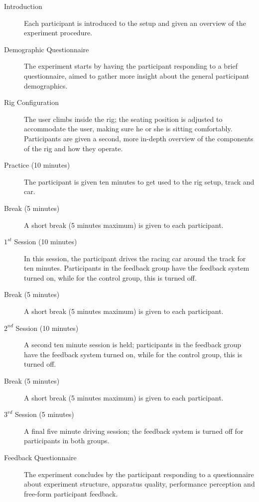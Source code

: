\documentclass{sig-alternate}
\begin{document}
\begin{description}
	\item[Introduction] Each participant is introduced to the setup and given an overview of the experiment procedure. 
	
	\item[Demographic Questionnaire] The experiment starts by having the participant responding to a brief questionnaire, aimed to gather more insight about the general participant demographics.
	
	\item[Rig Configuration] 
	The user climbs inside the rig; the seating position is adjusted to accommodate the user, making sure he or she is sitting comfortably. Participants are given a second, more in-depth overview of the components of the rig and how they operate.
	
	\item[Practice (10 minutes)] The participant is given ten minutes to get used to the rig setup, track and car.
	
	\item[Break (5 minutes)] A short break (5 minutes maximum) is given to each participant.
	
	\item[$1^{st}$ Session (10 minutes)] In this session, the participant drives the racing car around the track for ten minutes. Participants in the feedback group have the feedback system turned on, while for the control group, this is turned off.
	
	\item[Break (5 minutes)] A short break (5 minutes maximum) is given to each participant.
	
	\item[$2^{nd}$ Session (10 minutes)] A second ten minute session is held; participants in the feedback group have the feedback system turned on, while for the control group, this is turned off.
	
	\item[Break (5 minutes)] A short break (5 minutes maximum) is given to each participant.
	
	\item[$3^{rd}$ Session (5 minutes)] A final five minute driving session; the feedback system is turned off for participants in both groups.
	
	\item[Feedback Questionnaire] The experiment concludes by the participant responding to a questionnaire about experiment structure, apparatus quality, performance perception and free-form participant feedback.
	
\end{description}
\end{document}
